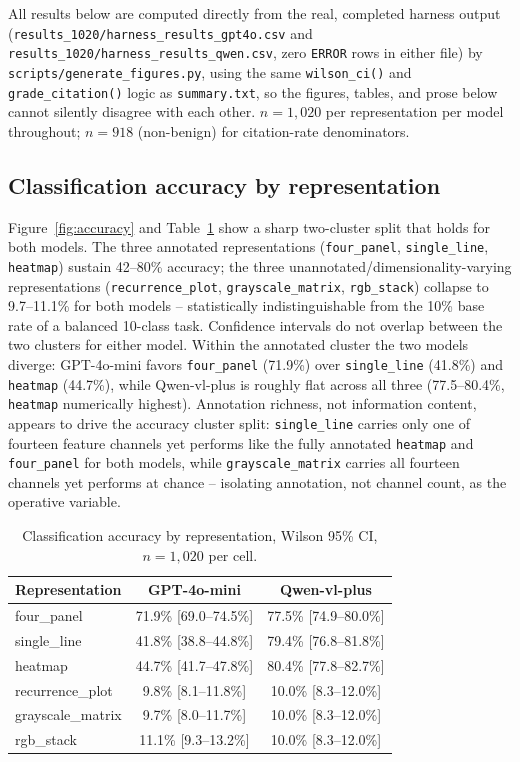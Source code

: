 \documentclass[11pt]{article}
\begin{document}
All results below are computed directly from the real, completed harness output
(\texttt{results\_1020/harness\_results\_gpt4o.csv} and
\texttt{results\_1020/harness\_results\_qwen.csv}, zero \texttt{ERROR} rows in either file) by
\texttt{scripts/generate\_figures.py}, using the same \texttt{wilson\_ci()} and
\texttt{grade\_citation()} logic as \texttt{summary.txt}, so the figures, tables, and prose below
cannot silently disagree with each other. $n=1{,}020$ per representation per model throughout;
$n=918$ (non-benign) for citation-rate denominators.

\subsection{Classification accuracy by representation}

Figure~\ref{fig:accuracy} and Table~\ref{tab:accuracy} show a sharp two-cluster split that holds for
both models. The three annotated representations (\texttt{four\_panel}, \texttt{single\_line},
\texttt{heatmap}) sustain 42--80\% accuracy; the three unannotated/dimensionality-varying
representations (\texttt{recurrence\_plot}, \texttt{grayscale\_matrix}, \texttt{rgb\_stack}) collapse
to 9.7--11.1\% for both models -- statistically indistinguishable from the 10\% base rate of a
balanced 10-class task. Confidence intervals do not overlap between the two clusters for either
model. Within the annotated cluster the two models diverge: GPT-4o-mini favors \texttt{four\_panel}
(71.9\%) over \texttt{single\_line} (41.8\%) and \texttt{heatmap} (44.7\%), while Qwen-vl-plus is
roughly flat across all three (77.5--80.4\%, \texttt{heatmap} numerically highest). Annotation
richness, not information content, appears to drive the accuracy cluster split: \texttt{single\_line}
carries only one of fourteen feature channels yet performs like the fully annotated \texttt{heatmap}
and \texttt{four\_panel} for both models, while \texttt{grayscale\_matrix} carries all fourteen
channels yet performs at chance -- isolating annotation, not channel count, as the operative variable.

\begin{table}[htbp]
\centering
\caption{Classification accuracy by representation, Wilson 95\% CI, $n=1{,}020$ per cell.}
\label{tab:accuracy}
\begin{tabular}{lcc}
\toprule
Representation & GPT-4o-mini & Qwen-vl-plus \\
\midrule
four\_panel        & 71.9\% [69.0--74.5\%] & 77.5\% [74.9--80.0\%] \\
single\_line        & 41.8\% [38.8--44.8\%] & 79.4\% [76.8--81.8\%] \\
heatmap             & 44.7\% [41.7--47.8\%] & 80.4\% [77.8--82.7\%] \\
recurrence\_plot    & 9.8\% [8.1--11.8\%]   & 10.0\% [8.3--12.0\%]  \\
grayscale\_matrix   & 9.7\% [8.0--11.7\%]   & 10.0\% [8.3--12.0\%]  \\
rgb\_stack          & 11.1\% [9.3--13.2\%]  & 10.0\% [8.3--12.0\%]  \\
\bottomrule
\end{tabular}
\end{table}
\end{document}
